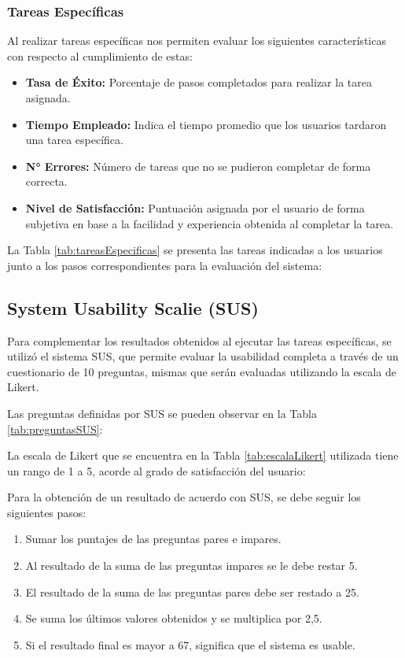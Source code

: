 \subsubsection{Tareas Específicas}
Al realizar tareas específicas nos permiten evaluar los siguientes características con respecto al cumplimiento de estas:
\begin{itemize}
    \item \textbf{Tasa de Éxito:} Porcentaje de pasos completados para realizar la tarea asignada.
    \item \textbf{Tiempo Empleado:} Indica el tiempo promedio que los usuarios tardaron una tarea específica.
    \item \textbf{N° Errores:} Número de tareas que no se pudieron completar de forma correcta.
    \item \textbf{Nivel de Satisfacción:} Puntuación asignada por el usuario de forma subjetiva en base a la facilidad y experiencia obtenida al completar la tarea.
\end{itemize}

La Tabla \ref{tab:tareasEspecificas} se presenta las tareas indicadas a los usuarios junto a los pasos correspondientes para la evaluación del sistema:



\subsection{System Usability Scalie (SUS)}
Para complementar los resultados obtenidos al ejecutar las tareas específicas, se utilizó el sistema SUS, que permite evaluar la usabilidad completa a través de un cuestionario de 10 preguntas, mismas que serán evaluadas utilizando la escala de Likert.

Las preguntas definidas por SUS se pueden observar en la Tabla \ref{tab:preguntasSUS}:



La escala de Likert que se encuentra en la Tabla \ref{tab:escalaLikert} utilizada tiene un rango de 1 a 5, acorde al grado de satisfacción del usuario:



Para la obtención de un resultado de acuerdo con SUS, se debe seguir los siguientes pasos:

\begin{enumerate}
    \item Sumar los puntajes de las preguntas pares e impares.
    \item Al resultado de la suma de las preguntas impares se le debe restar 5.
    \item El resultado de la suma de las preguntas pares debe ser restado a 25.
    \item Se suma los últimos valores obtenidos y se multiplica por 2,5.
    \item Si el resultado final es mayor a 67, significa que el sistema es usable.
\end{enumerate}


